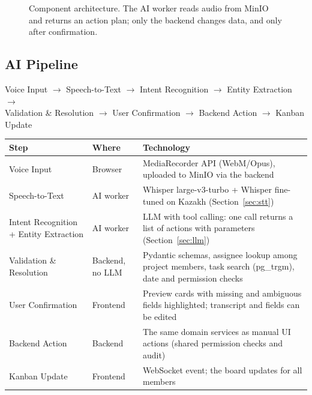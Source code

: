 \documentclass[11pt,a4paper]{article}
\newcommand{\tblstart}{\small\rowcolors{2}{gray!7}{white}}
\begin{document}
\begin{figure}[H]
\caption{Component architecture. The AI worker reads audio from MinIO and returns an action plan; only the backend changes data, and only after confirmation.}
\end{figure}

\subsection{AI Pipeline}

\begin{center}
\small
Voice Input $\rightarrow$ Speech-to-Text $\rightarrow$ Intent Recognition $\rightarrow$ Entity Extraction $\rightarrow$\\
Validation \& Resolution $\rightarrow$ User Confirmation $\rightarrow$ Backend Action $\rightarrow$ Kanban Update
\end{center}

{\tblstart
\begin{xltabular}{\textwidth}{P{3.4cm} P{2.6cm} L}
\toprule
\textbf{Step} & \textbf{Where} & \textbf{Technology} \\
\midrule
\endhead
Voice Input & Browser & MediaRecorder API (WebM/Opus), uploaded to MinIO via the backend \\
Speech-to-Text & AI worker & Whisper large-v3-turbo + Whisper fine-tuned on Kazakh (Section~\ref{sec:stt}) \\
Intent Recognition + Entity Extraction & AI worker & LLM with tool calling: one call returns a list of actions with parameters (Section~\ref{sec:llm}) \\
Validation \& Resolution & Backend, no LLM & Pydantic schemas, assignee lookup among project members, task search (pg\_trgm), date and permission checks \\
User Confirmation & Frontend & Preview cards with missing and ambiguous fields highlighted; transcript and fields can be edited \\
Backend Action & Backend & The same domain services as manual UI actions (shared permission checks and audit) \\
Kanban Update & Frontend & WebSocket event; the board updates for all members \\
\bottomrule
\end{xltabular}}
\end{document}
